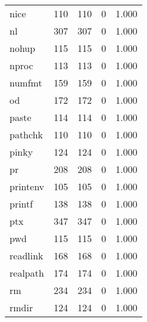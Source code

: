\begin{longtable}{lp{4.5cm}p{4.5cm}p{4.5cm}p{4.5cm}}
nice      &                     110 &              110 &                 0 &                        1.000 \\
nl        &                     307 &              307 &                 0 &                        1.000 \\
nohup     &                     115 &              115 &                 0 &                        1.000 \\
nproc     &                     113 &              113 &                 0 &                        1.000 \\
numfmt    &                     159 &              159 &                 0 &                        1.000 \\
od        &                     172 &              172 &                 0 &                        1.000 \\
paste     &                     114 &              114 &                 0 &                        1.000 \\
pathchk   &                     110 &              110 &                 0 &                        1.000 \\
pinky     &                     124 &              124 &                 0 &                        1.000 \\
pr        &                     208 &              208 &                 0 &                        1.000 \\
printenv  &                     105 &              105 &                 0 &                        1.000 \\
printf    &                     138 &              138 &                 0 &                        1.000 \\
ptx       &                     347 &              347 &                 0 &                        1.000 \\
pwd       &                     115 &              115 &                 0 &                        1.000 \\
readlink  &                     168 &              168 &                 0 &                        1.000 \\
realpath  &                     174 &              174 &                 0 &                        1.000 \\
rm        &                     234 &              234 &                 0 &                        1.000 \\
rmdir     &                     124 &              124 &                 0 &                        1.000 \\

\end{longtable}

